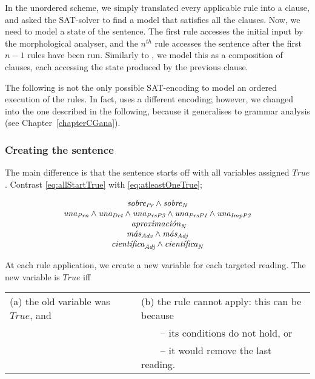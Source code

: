 In the unordered scheme, we simply translated every applicable rule into a clause, and asked the SAT-solver to find a model that satisfies all the clauses. 
Now, we need to model a state of the sentence. The first rule accesses the initial input
by the morphological analyser, and the $n^{th}$ rule accesses the sentence after the first $n-1$ rules have been run.
Similarly to \cite{lager_nivre01}, we model this as a composition of clauses, each accessing the state produced by the previous clause.


The following is not the only possible SAT-encoding to model an ordered execution of the rules. In fact, \cite{listenmaa_claessen2015} uses a different encoding; however, we changed into the one described in the following, because it generalises to grammar analysis (see Chapter~\ref{chapterCGana}).

\subsubsection{Creating the sentence}

The main difference is that the sentence starts off with all variables assigned $True$. Contrast \ref{eq:allStartTrue} with \ref{eq:atleastOneTrue}; 

\begin{equation}
\begin{array}{c}
\sobrePr \wedge \sobreN \\
\unaPrn \wedge \unaDet \wedge \unaPrsPThree \wedge \unaPrsPOne \wedge \unaImp \\
\aproximacionN \\
\masAdv \wedge \masAdj \\
\cientificaAdj \wedge \cientificaN \\
\end{array}
\label{eq:allStartTrue}
\end{equation}

\noindent At each rule application, we create a new variable for each targeted reading. The new variable is $True$ iff 

\begin{tabular}{l l}
(a) the old variable was $True$, and & (b) the rule cannot apply: this can be because \\
                                     & ~~~~-- its conditions do not hold, or \\
                                     & ~~~~-- it would remove the last reading.
\end{tabular}

